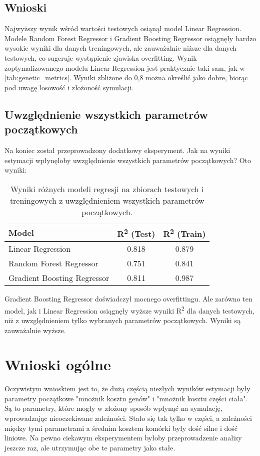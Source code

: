 \documentclass{article}
\begin{document}
\subsection{Wnioski}
Najwyższy wynik wśród wartości testowych osiąnął model Linear Regression. Modele Random Forest Regressor i Gradient Boosting Regressor osiągnęły bardzo wysokie wyniki dla danych treningowych, ale zauważalnie niższe dla danych testowych, co sugeruje wystąpienie zjawiska overfitting. Wynik zoptymalizowanego modelu Linear Regression jest praktycznie taki sam, jak w \ref{tab:genetic_metrics}. Wyniki zbliżone do 0,8 można określić jako dobre, biorąc pod uwagę losowość i złożoność symulacji.

\subsection{Uwzględnienie wszystkich parametrów początkowych}
Na koniec został przeprowadzony dodatkowy eksperyment. Jak na wyniki estymacji wpłynęłoby uwzględnienie wszystkich parametrów początkowych? Oto wyniki:
\begin{table}[H]
    \centering
    \caption{Wyniki różnych modeli regresji na zbiorach testowych i treningowych z uwzględnieniem wszystkich parametrów początkowych.}
    \begin{tabular}{lcc}
        \toprule
        \textbf{Model} & \textbf{R\textsuperscript{2} (Test)} & \textbf{R\textsuperscript{2} (Train)} \\
        \midrule
        Linear Regression & 0.818 & 0.879 \\
        Random Forest Regressor & 0.751 & 0.841 \\
        Gradient Boosting Regressor & 0.811 & 0.987 \\
        \bottomrule
    \end{tabular}
\end{table}

Gradient Boosting Regressor doświadczył mocnego overfittingu. Ale zarówno ten model, jak i Linear Regression osiągnęły wyższe wyniki R\textsuperscript{2} dla danych testowych, niż z uwzględnieniem tylko wybranych parametrów początkowych. Wyniki są zauważalnie wyższe.

\section{Wnioski ogólne}
Oczywistym wnioskiem jest to, że dużą częścią niezłych wyników estymacji były parametry początkowe "mnożnik kosztu genów" i "mnożnik kosztu części ciała". Są to parametry, które mogły w złożony sposób wpłynąć na symulację, wprowadzając nieoczekiwane zależności. Stało się tak tylko w części, a zależności między tymi parametrami a średnim kosztem komórki były dość silne i dość liniowe. Na pewno ciekawym eksperymentem byłoby przeprowadzenie analizy jeszcze raz, ale utrzymując obe te parametry jako stałe. 
\end{document}
